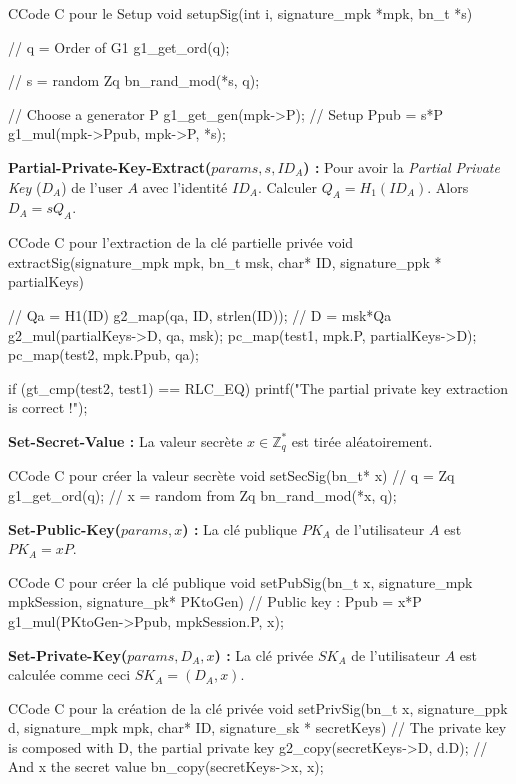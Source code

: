 \begin{sourcebox}{C}{Code C pour le Setup}
	void setupSig(int i, signature_mpk *mpk, bn_t *s){
		// q = Order of G1
		g1_get_ord(q);
		
		// s = random Zq
		bn_rand_mod(*s, q);
		
		// Choose a generator P
		g1_get_gen(mpk->P);
		// Setup Ppub = s*P
		g1_mul(mpk->Ppub, mpk->P, *s);
	}
\end{sourcebox}

\textbf{Partial-Private-Key-Extract($params, s, ID_A$) :} Pour avoir la \textit{Partial Private Key} ($D_A$) de l'user $A$ avec l'identité $ID_A$. Calculer $Q_A = H_1(ID_A)$. Alors $D_A = sQ_A$.

\begin{sourcebox}{C}{Code C pour l'extraction de la clé partielle privée}
	void extractSig(signature_mpk mpk, bn_t msk, char* ID, signature_ppk * partialKeys) {
		// Qa = H1(ID)
		g2_map(qa, ID, strlen(ID));
		// D = msk*Qa
		g2_mul(partialKeys->D, qa, msk);
		pc_map(test1, mpk.P, partialKeys->D);
		pc_map(test2, mpk.Ppub, qa);
		
		if (gt_cmp(test2, test1) == RLC_EQ) {
			printf("The partial private key extraction is correct !\n");
		}
	}
\end{sourcebox}

\textbf{Set-Secret-Value :} La valeur secrète $x \in \mathbb{Z}_q^*$ est tirée aléatoirement.

\begin{sourcebox}{C}{Code C pour créer la valeur secrète}
	void setSecSig(bn_t* x){
		// q = Zq
		g1_get_ord(q);
		// x = random from Zq
		bn_rand_mod(*x, q);
	}
\end{sourcebox}

\textbf{Set-Public-Key($params, x$) :}  La clé publique $PK_A$ de l'utilisateur $A$ est $PK_A = xP$.

\begin{sourcebox}{C}{Code C pour créer la clé publique}
	void setPubSig(bn_t x, signature_mpk mpkSession, signature_pk* PKtoGen){
		// Public key : Ppub = x*P
		g1_mul(PKtoGen->Ppub, mpkSession.P, x);
	}
\end{sourcebox}

\textbf{Set-Private-Key($params, D_A, x$) :} La clé privée $SK_A$ de l'utilisateur $A$ est calculée comme ceci $SK_A = (D_A, x)$.

\begin{sourcebox}{C}{Code C pour la création de la clé privée}
	void setPrivSig(bn_t x, signature_ppk d, signature_mpk mpk, char* ID, signature_sk * secretKeys){
		// The private key is composed with D, the partial private key
		g2_copy(secretKeys->D, d.D);
		// And x the secret value
		bn_copy(secretKeys->x, x);
	}
\end{sourcebox}

